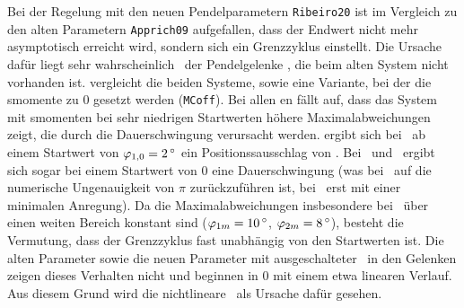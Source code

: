 Bei der Regelung mit den neuen Pendelparametern \texttt{Ribeiro20} ist im Vergleich zu den alten Parametern \texttt{Apprich09} aufgefallen, dass der Endwert nicht mehr asymptotisch erreicht wird, sondern sich ein Grenzzyklus einstellt.
Die Ursache dafür liegt sehr wahrscheinlich \crb\ der Pendelgelenke , die beim alten System nicht vorhanden ist.
 vergleicht die beiden Systeme, sowie eine Variante, bei der die \crb smomente zu 0 gesetzt werden (\texttt{MCoff}).
Bei allen \ap en fällt auf, dass das System mit \crb smomenten bei sehr niedrigen Startwerten höhere Maximalabweichungen zeigt, die durch die Dauerschwingung verursacht werden.
\ZB ergibt sich bei \apz\ ab einem Startwert von $\pheo=\valdeg{2}$ ein Positionssausschlag von .
Bei \apd\ und \apv\ ergibt sich sogar bei einem Startwert von 0 eine Dauerschwingung (was bei \apd\ auf die numerische Ungenauigkeit von $\pi$ zurückzuführen ist, bei \apv\ erst mit einer minimalen Anregung).
Da die Maximalabweichungen insbesondere bei \apv\ über einen weiten Bereich konstant sind ($\phem=\valdeg{10}$, $\phzm=\valdeg{8}$), besteht die Vermutung, dass der Grenzzyklus fast unabhängig von den Startwerten ist.
Die alten Parameter sowie die neuen Parameter mit ausgeschalteter \crb\ in den Gelenken zeigen dieses Verhalten nicht und beginnen in 0 mit einem etwa linearen Verlauf.
Aus diesem Grund wird die nichtlineare \crb\ als Ursache dafür gesehen.


